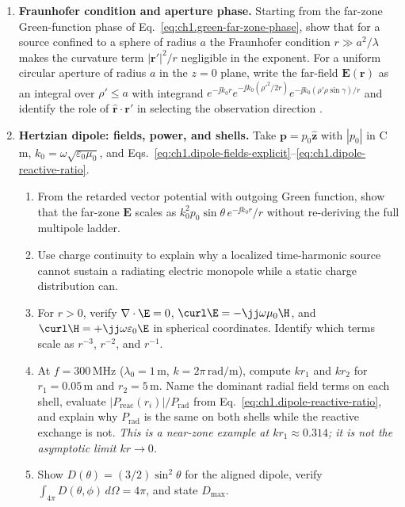 \begin{enumerate}
\item \textbf{Fraunhofer condition and aperture phase.}
Starting from the far-zone Green-function phase of Eq.~\eqref{eq:ch1.green-far-zone-phase}, show that for a source confined to a sphere of radius $a$ the Fraunhofer condition $r\gg a^2/\lambda$ makes the curvature term $|\mathbf{r}'|^2/r$ negligible in the exponent. For a uniform circular aperture of radius $a$ in the $z=0$ plane, write the far-field $\mathbf{E}(\mathbf{r})$ as an integral over $\rho'\le a$ with integrand $e^{-\jj k_0 r}e^{-\jj k_0(\rho'^2/2r)}e^{-\jj k_0(\rho'\rho\sin\gamma)/r}$ and identify the role of $\hat{\mathbf{r}}\cdot\mathbf{r}'$ in selecting the observation direction \cite{bornwolf1999,silver1949}.

\item \textbf{Hertzian dipole: fields, power, and shells.}
Take $\mathbf{p}=p_0\hat{\mathbf{z}}$ with $|p_0|$ in C\,m, $k_0=\omega\sqrt{\varepsilon_0\mu_0}$, and Eqs.~\eqref{eq:ch1.dipole-fields-explicit}--\eqref{eq:ch1.dipole-reactive-ratio}.
\begin{enumerate}[label=(\alph*)]
\item From the retarded vector potential with outgoing Green function, show that the far-zone $\mathbf{E}$ scales as $k_0^2 p_0\sin\theta\,e^{-\jj k_0 r}/r$ without re-deriving the full multipole ladder.
\item Use charge continuity to explain why a localized time-harmonic source cannot sustain a radiating electric monopole while a static charge distribution can.
\item For $r>0$, verify $\nabla\cdot\E=0$, $\curl\E=-\jj\omega\mu_0\H$, and $\curl\H=+\jj\omega\varepsilon_0\E$ in spherical coordinates. Identify which terms scale as $r^{-3}$, $r^{-2}$, and $r^{-1}$.
\item At $f=300\,\mathrm{MHz}$ ($\lambda_0=1\,\mathrm{m}$, $k=2\pi\,\mathrm{rad/m}$), compute $kr_1$ and $kr_2$ for $r_1=0.05\,\mathrm{m}$ and $r_2=5\,\mathrm{m}$. Name the dominant radial field terms on each shell, evaluate $|P_{\mathrm{reac}}(r_i)|/P_{\mathrm{rad}}$ from Eq.~\eqref{eq:ch1.dipole-reactive-ratio}, and explain why $P_{\mathrm{rad}}$ is the same on both shells while the reactive exchange is not. \emph{This is a near-zone example at $kr_1\approx0.314$; it is not the asymptotic limit $kr\to0$.}
\item Show $D(\theta)=(3/2)\sin^2\theta$ for the aligned dipole, verify $\int_{4\pi}D(\theta,\phi)\,d\Omega=4\pi$, and state $D_{\max}$.
\end{enumerate}


\end{enumerate}
